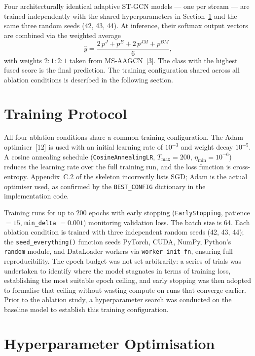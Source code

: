 Four architecturally identical adaptive ST-GCN models --- one per stream --- are trained independently with the shared hyperparameters in Section~\ref{sec:training} and the same three random seeds (42, 43, 44). At inference, their softmax output vectors are combined via the weighted average
\begin{equation}
\hat{y} = \frac{2\,p^{J} + p^{B} + 2\,p^{JM} + p^{BM}}{6},
\end{equation}
with weights $2{:}1{:}2{:}1$ taken from MS-AAGCN~[3]. The class with the highest fused score is the final prediction. The training configuration shared across all ablation conditions is described in the following section.

\section{Training Protocol}
\label{sec:training}

All four ablation conditions share a common training configuration. The Adam optimiser~[12] is used with an initial learning rate of $10^{-3}$ and weight decay $10^{-5}$. A cosine annealing schedule (\texttt{CosineAnnealingLR}, $T_{\text{max}} = 200$, $\eta_{\min} = 10^{-6}$) reduces the learning rate over the full training run, and the loss function is cross-entropy. Appendix~C.2 of the skeleton incorrectly lists SGD; Adam is the actual optimiser used, as confirmed by the \texttt{BEST\_CONFIG} dictionary in the implementation code.

Training runs for up to 200 epochs with early stopping (\texttt{EarlyStopping}, patience $= 15$, \texttt{min\_delta} $= 0.001$) monitoring validation loss. The batch size is 64. Each ablation condition is trained with three independent random seeds (42, 43, 44); the \texttt{seed\_everything()} function seeds PyTorch, CUDA, NumPy, Python's \texttt{random} module, and DataLoader workers via \texttt{worker\_init\_fn}, ensuring full reproducibility. The epoch budget was not set arbitrarily: a series of trials was undertaken to identify where the model stagnates in terms of training loss, establishing the most suitable epoch ceiling, and early stopping was then adopted to formalise that ceiling without wasting compute on runs that converge earlier. Prior to the ablation study, a hyperparameter search was conducted on the baseline model to establish this training configuration.

\section{Hyperparameter Optimisation}
\label{sec:hpo}

